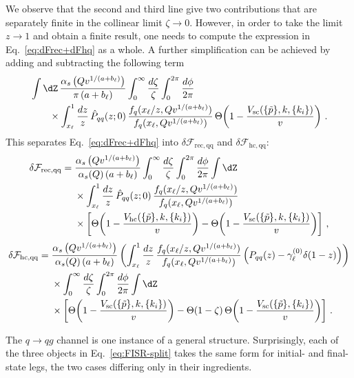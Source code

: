 We observe that the second and third line give two contributions that
are separately finite in the collinear limit $\zeta\to 0$. However, in
order to take the limit $z\to 1$ and obtain a finite result, one needs to compute the expression in
Eq.~\eqref{eq:dFrec+dFhq} as a whole. A further simplification can be achieved by adding and subtracting the following term
\begin{align}
&\int \dZ\, \frac{\alpha_s\left(Q v^{1/(a+b_\ell)}\right)}{\pi\left(a+b_\ell\right)}\int_0^\infty\frac{d\zeta}{\zeta}\int_0^{2\pi}\frac{d\phi}{2\pi}\nonumber\\
&\qquad\times \int_{x_\ell}^1 \frac{dz}{z}\,  \hat P_{qq}(z;0)\, \frac{f_q(x_\ell/z,Qv^{1/(a+b_\ell)})}{f_q(x_\ell,Qv^{1/(a+b_\ell)})}\,
\Theta\!\left(1-\frac{V_{\mathrm{sc}}(\{\tilde{p}\},k,\{k_i\})}{v}\right)\,. \label{eq:dFhc-sub}
\end{align}
This separates Eq.~\eqref{eq:dFrec+dFhq} into $\delta \mathcal{F}_{\mathrm{rec,qq}}$ and $\delta \mathcal{F}_{\mathrm{hc,qq}}$:
\begin{align}
\delta \mathcal{F}_{\mathrm{rec,qq}} ={}& \frac{\alpha_s\left(Q v^{1/(a+b_\ell)}\right)}{\alpha_s(Q)\left(a+b_\ell\right)}\int_0^\infty\frac{d\zeta}{\zeta}\int_0^{2\pi}\frac{d\phi}{2\pi} \int \dZ\nonumber\\
&\times\int_{x_\ell}^1 \frac{dz}{z}\, \hat P_{qq}(z;0)\,\frac{f_q(x_\ell/z,Qv^{1/(a+b_\ell)})}{f_q(x_\ell,Qv^{1/(a+b_\ell)})}\nonumber\\
&\times\left[\Theta\!\left(1-\frac{V_{\mathrm{hc}}(\{\tilde{p}\},k,\{k_i\})}{v}\right)-\Theta\!\left(1-\frac{V_{\mathrm{sc}}(\{\tilde{p}\},k,\{k_i\})}{v}\right)\right]\,, \label{eq:dFrec-qq}
\end{align}
\begin{align}
\delta \mathcal{F}_{\mathrm{hc,qq}} ={}& \frac{\alpha_s\left(Qv^{1/(a+b_\ell)}\right)}{\alpha_s(Q)\left(a+b_\ell\right)}\left(\int_{x_\ell}^1 \frac{dz}{z}\,\frac{f_q(x_\ell/z,Qv^{1/(a+b_\ell)})}{f_q(x_\ell,Qv^{1/(a+b_\ell)})} \left(P_{qq}(z)-\gamma^{(0)}_\ell\delta(1-z)\right)\right)\nonumber\\
&\times\int_0^\infty\frac{d\zeta}{\zeta}\int_0^{2\pi}\frac{d\phi}{2\pi}\int \dZ\nonumber\\
&\times\left[\Theta\!\left(1-\frac{V_{\mathrm{sc}}(\{\tilde{p}\},k,\{k_i\})}{v}\right) -\Theta(1-\zeta)\,\Theta\!\left(1-\frac{V_{\mathrm{sc}}(\{\tilde{p}\},\{k_i\})}{v}\right)\right]\,. \label{eq:dFhc-qq}
\end{align}

The $q\to qg$ channel is one instance of a general structure. 
Surprisingly, each of the three objects in Eq.~\eqref{eq:FISR-split}
takes the same form for initial- and final-state legs, the two cases
differing only in their ingredients. 

